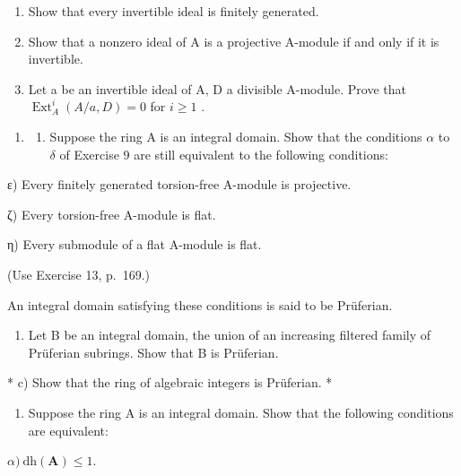 \begin{enumerate}
\def\labelenumi{\alph{enumi})}
\item
  Show that every invertible ideal is finitely generated.
\item
  Show that a nonzero ideal of A is a projective A-module if and only if it is invertible.
\item
  Let a be an invertible ideal of A, D a divisible A-module. Prove that \(\operatorname{Ext}_A^i(A/a, D) = 0\) for \(i \geqslant 1\) .
\end{enumerate}

\begin{enumerate}
\def\labelenumi{\arabic{enumi})}
\setcounter{enumi}{10}
\tightlist
\item
  \begin{enumerate}
  \def\labelenumii{\alph{enumii})}
  \tightlist
  \item
    Suppose the ring A is an integral domain. Show that the conditions \(\alpha\) to \(\delta\) of Exercise 9 are still equivalent to the following conditions:
  \end{enumerate}
\end{enumerate}

ε) Every finitely generated torsion-free A-module is projective.

ζ) Every torsion-free A-module is flat.

η) Every submodule of a flat A-module is flat.

(Use Exercise 13, p.~169.)

An integral domain satisfying these conditions is said to be Prüferian.

\begin{enumerate}
\def\labelenumi{\alph{enumi})}
\setcounter{enumi}{1}
\tightlist
\item
  Let B be an integral domain, the union of an increasing filtered family of Prüferian subrings. Show that B is Prüferian.
\end{enumerate}

* c) Show that the ring of algebraic integers is Prüferian. *

\begin{enumerate}
\def\labelenumi{\arabic{enumi})}
\setcounter{enumi}{11}
\tightlist
\item
  Suppose the ring A is an integral domain. Show that the following conditions are equivalent:
\end{enumerate}

\(\alpha)\ \mathrm{dh}(\mathbf{A}) \leqslant 1.\)

